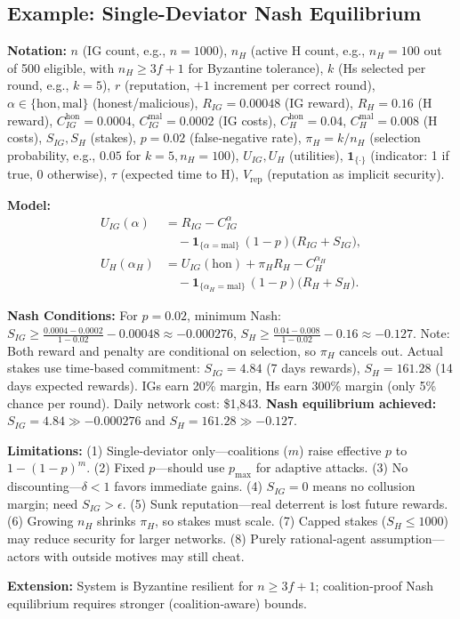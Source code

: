 \subsection{Example: Single-Deviator Nash Equilibrium}

\textbf{Notation:} $n$ (IG count, e.g., $n=1000$), $n_H$ (active H count, e.g., $n_H=100$ out of 500 eligible, with $n_H \geq 3f+1$ for Byzantine tolerance), $k$ (Hs selected per round, e.g., $k=5$), $r$ (reputation, $+1$ increment per correct round), $\alpha \in \{\text{hon}, \text{mal}\}$ (honest/malicious), $R_{IG}=0.00048$ (IG reward), $R_H=0.16$ (H reward), $C_{IG}^{\text{hon}}=0.0004$, $C_{IG}^{\text{mal}}=0.0002$ (IG costs), $C_H^{\text{hon}}=0.04$, $C_H^{\text{mal}}=0.008$ (H costs), $S_{IG},S_H$ (stakes), $p=0.02$ (false‑negative rate), $\pi_H=k/n_H$ (selection probability, e.g., $0.05$ for $k=5, n_H=100$), $U_{IG},U_H$ (utilities), $\mathbf{1}_{\{\cdot\}}$ (indicator: 1 if true, 0 otherwise), $\tau$ (expected time to H), $V_{\text{rep}}$ (reputation as implicit security).

\textbf{Model:}
\[
\begin{aligned}
U_{IG}(\alpha) &= R_{IG}-C_{IG}^{\alpha} \\ 
               &\quad -\mathbf{1}_{\{\alpha=\mathrm{mal}\}}\,(1-p)\bigl(R_{IG}+S_{IG}\bigr), \\[6pt]
U_H(\alpha_H)  &= U_{IG}(\mathrm{hon}) + \pi_H R_H - C_H^{\alpha_H} \\ 
               &\quad -\mathbf{1}_{\{\alpha_H=\mathrm{mal}\}}\,(1-p)\bigl(R_H+S_H\bigr).
\end{aligned}
\]

\textbf{Nash Conditions:} For $p=0.02$, minimum Nash: $S_{IG} \geq \tfrac{0.0004 - 0.0002}{1-0.02} - 0.00048 \approx -0.000276$, $S_H \geq \tfrac{0.04 - 0.008}{1-0.02} - 0.16 \approx -0.127$. Note: Both reward and penalty are conditional on selection, so $\pi_H$ cancels out. Actual stakes use time‑based commitment: $S_{IG} = 4.84$ (7 days rewards), $S_H = 161.28$ (14 days expected rewards). IGs earn 20\% margin, Hs earn 300\% margin (only 5\% chance per round). Daily network cost: \$1{,}843. \textbf{Nash equilibrium achieved:} $S_{IG} = 4.84 \gg -0.000276$ and $S_H = 161.28 \gg -0.127$.

\textbf{Limitations:} (1) Single-deviator only—coalitions ($m$) raise effective $p$ to $1-(1-p)^m$. (2) Fixed $p$—should use $p_{\max}$ for adaptive attacks. (3) No discounting—$\delta<1$ favors immediate gains. (4) $S_{IG}=0$ means no collusion margin; need $S_{IG}>\epsilon$. (5) Sunk reputation—real deterrent is lost future rewards. (6) Growing $n_H$ shrinks $\pi_H$, so stakes must scale. (7) Capped stakes ($S_H\le 1000$) may reduce security for larger networks. (8) Purely rational‑agent assumption—actors with outside motives may still cheat.

\textbf{Extension:} System is Byzantine resilient for $n \geq 3f+1$; coalition‑proof Nash equilibrium requires stronger (coalition‑aware) bounds.
